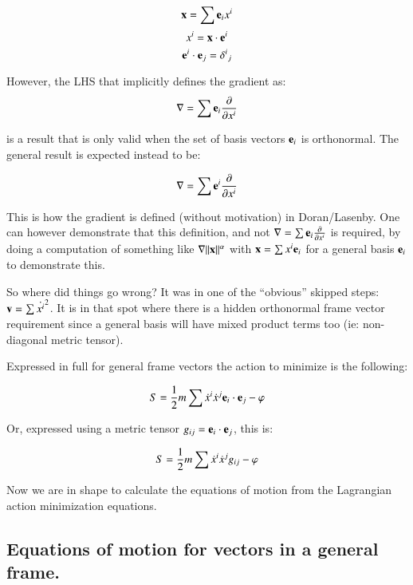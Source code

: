 \documentclass{article}
\newcommand{\grad}[0]{\nabla}
\newcommand{\PD}[2]{ \frac{\partial{#1}}{\partial {#2}} }
\begin{document}
\begin{equation*}
\mathbf{x} = \sum \mathbf{e}_i x^i
\end{equation*}
\begin{equation*}
x^i = \mathbf{x} \cdot \mathbf{e}^i
\end{equation*}
\begin{equation*}
\mathbf{e}^i \cdot \mathbf{e}_j = {\delta^i}_j
\end{equation*}

However, the LHS that implicitly defines the gradient as:
\begin{equation*}
\grad = \sum \Be_i \PD{}{x^i} 
\end{equation*}

is a result that is only valid when the set of basis vectors $\mathbf{e}_i$ is orthonormal.  The general result is
expected instead to be:

\begin{equation*}
\grad = \sum \Be^i \PD{}{x^i} 
\end{equation*}

This is how the gradient is defined (without motivation) in Doran/Lasenby.  One can however demonstrate that this definition, and not $\grad = \sum \Be_i \PD{}{x^i}$ is required, by doing a computation of something like $\grad \norm{\Bx}^\alpha$ with $\mathbf{x} = \sum x^i \mathbf{e}_i$ for a general basis $\mathbf{e}_i$ to demonstrate this.

So where did things go wrong?  It was in one of the ``obvious'' skipped steps: $\mathbf{v} = \sum {\dot{x^i}}^2$.  It is in that
spot where there is a hidden orthonormal frame vector requirement since a general basis will have mixed product terms too
(ie: non-diagonal metric tensor).

Expressed in full for general frame vectors the action to minimize is the following:

\begin{equation}
S = \frac{1}{2} m \sum \dot{x}^i \dot{x}^j \mathbf{e}_i \cdot \mathbf{e}_j -\varphi
\end{equation}

Or, expressed using a metric tensor $g_{ij} = \mathbf{e}_i \cdot \mathbf{e}_j$, this is:

\begin{equation}
S = \frac{1}{2} m \sum \dot{x}^i \dot{x}^j g_{ij} -\varphi
\end{equation}

Now we are in shape to calculate the equations of motion from the Lagrangian action minimization equations.

\subsection{ Equations of motion for vectors in a general frame. }
\end{document}
